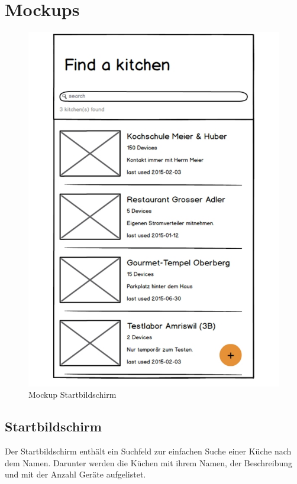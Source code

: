 
\section{Mockups}
\label{sec:Mockups}

\begin{figure}
	\includegraphics[page=1,trim=0 0 0 0,clip,scale=0.21]{uiux/res/mockups}
	\caption{Mockup Startbildschirm}
    \label{abb:mockStartScreen}
\end{figure}

\subsection{Startbildschirm}
\label{subsec:Startbildschirm}

Der Startbildschirm enthält ein Suchfeld zur einfachen Suche einer Küche nach dem Namen. Darunter werden die Küchen mit ihrem Namen, der Beschreibung und mit der Anzahl Geräte aufgelistet. 

